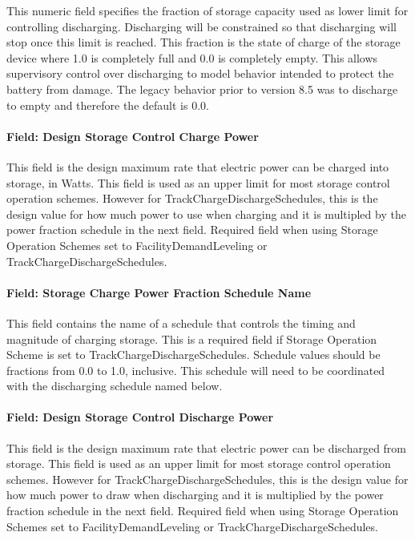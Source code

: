 This numeric field specifies the fraction of storage capacity used as lower limit for controlling discharging. Discharging will be constrained so that discharging will stop once this limit is reached. This fraction is the state of charge of the storage device where 1.0 is completely full and 0.0 is completely empty. This allows supervisory control over discharging to model behavior intended to protect the battery from damage. The legacy behavior prior to version 8.5 was to discharge to empty and therefore the default is 0.0.

\paragraph{Field: Design Storage Control Charge Power}\label{field-design-storage-control-charge-power}

This field is the design maximum rate that electric power can be charged into storage, in Watts. This field is used as an upper limit for most storage control operation schemes. However for TrackChargeDischargeSchedules, this is the design value for how much power to use when charging and it is multipled by the power fraction schedule in the next field. Required field when using Storage Operation Schemes set to FacilityDemandLeveling or TrackChargeDischargeSchedules.

\paragraph{Field: Storage Charge Power Fraction Schedule Name}\label{field-storage-charge-power-fraction-schedule-name}

This field contains the name of a schedule that controls the timing and magnitude of charging storage. This is a required field if Storage Operation Scheme is set to TrackChargeDischargeSchedules. Schedule values should be fractions from 0.0 to 1.0, inclusive. This schedule will need to be coordinated with the discharging schedule named below.

\paragraph{Field: Design Storage Control Discharge Power}\label{field-design-storage-control-discharge-power}

This field is the design maximum rate that electric power can be discharged from storage. This field is used as an upper limit for most storage control operation schemes. However for TrackChargeDischargeSchedules, this is the design value for how much power to draw when discharging and it is multiplied by the power fraction schedule in the next field. Required field when using Storage Operation Schemes set to FacilityDemandLeveling or TrackChargeDischargeSchedules.

